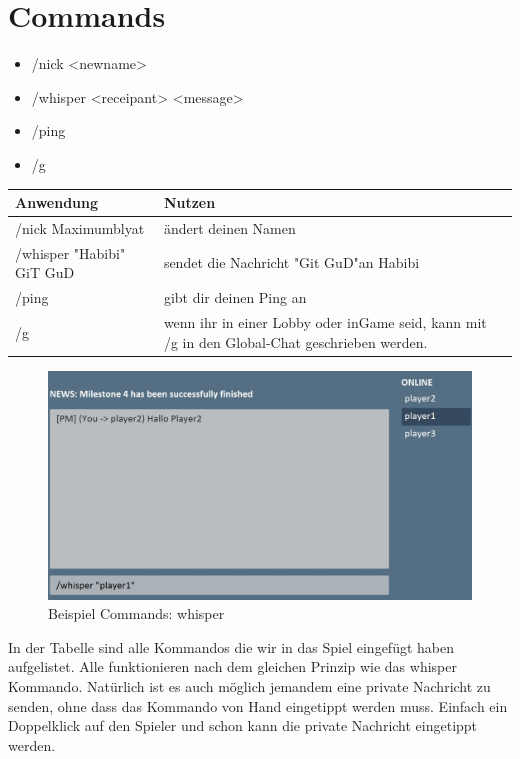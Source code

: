 \documentclass{scrartcl}
\begin{document}
\section{Commands}
\begin{itemize}
    \item /nick <newname>
    \item /whisper <\grqq receipant\grqq> <message>
    \item /ping
	\item /g
	
\end{itemize}
\begin{center}
    \begin{tabular}{| p{6cm} | p{6cm} |}
        \hline
        \textbf{Anwendung} & \textbf{Nutzen} \\ \hline
        /nick Maximumblyat & ändert deinen Namen   \\ \hline
        /whisper "Habibi" \space GiT GuD & sendet die Nachricht "Git GuD"\space an Habibi  \\ \hline
        /ping & gibt dir deinen Ping an  \\ \hline
        /g & wenn ihr in einer Lobby oder inGame seid, kann mit /g in den Global-Chat geschrieben werden. \\ \hline
    \end{tabular}
\end{center}
\begin{figure}[H]
	\includegraphics[width=\linewidth]{whisper2.JPG}
	\caption{Beispiel Commands: whisper}
	\label{fig:whisper}
\end{figure}
In der Tabelle sind alle Kommandos die wir in das Spiel eingefügt haben aufgelistet. Alle funktionieren nach dem gleichen Prinzip wie das whisper Kommando. Natürlich ist es auch möglich jemandem eine private Nachricht zu senden, ohne dass das Kommando von Hand eingetippt werden muss. Einfach ein Doppelklick auf den Spieler und schon kann die private Nachricht eingetippt werden.
\end{document}
